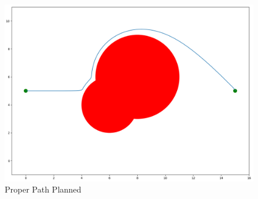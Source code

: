 \documentclass{article}
\begin{document}
\begin{figure}[h]
    \centering
    \includegraphics[scale=1]{best_path}
    \caption{Proper Path Planned}
    \label{fig:ppp}
\end{figure}
\end{document}

